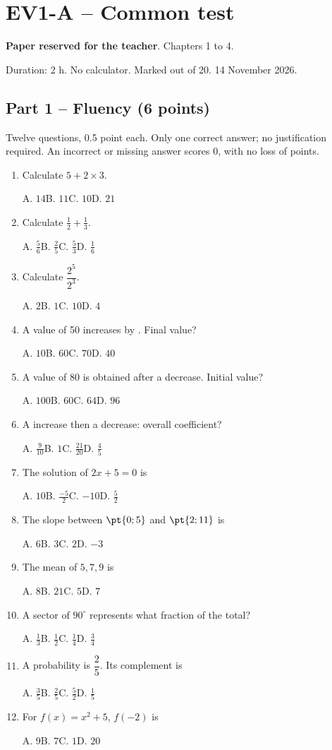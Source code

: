 \mxnewpage\section*{EV1-A -- Common test}\label{EV1-A}
\textbf{Paper reserved for the teacher}. Chapters 1 to 4.\par Duration: 2 h. No calculator. Marked out of 20. 14 November 2026.
\subsection*{Part 1 -- Fluency (6 points)}
Twelve questions, \num{0,5} point each. Only one correct answer; no justification required. An incorrect or missing answer scores 0, with no loss of points.
\begin{enumerate}
\item Calculate $5+2\times3$.\par A. $14$\quad B. $11$\quad C. $10$\quad D. $21$
\item Calculate $\frac12+\frac13$.\par A. $\frac{5}{6}$\quad B. $\frac{2}{5}$\quad C. $\frac{5}{3}$\quad D. $\frac{1}{6}$
\item Calculate $\dfrac{2^5}{2^{3}}$.\par A. $2$\quad B. $1$\quad C. $10$\quad D. $4$
\item A value of 50 increases by . Final value?\par A. $10$\quad B. $60$\quad C. $70$\quad D. $40$
\item A value of 80 is obtained after a  decrease. Initial value?\par A. $100$\quad B. $60$\quad C. $64$\quad D. $96$
\item A  increase then a  decrease: overall coefficient?\par A. $\frac{9}{10}$\quad B. $1$\quad C. $\frac{21}{20}$\quad D. $\frac{4}{5}$
\item The solution of $2x+5=0$ is\par A. $10$\quad B. $\frac{-5}{2}$\quad C. $-10$\quad D. $\frac{5}{2}$
\item The slope between $\pt{0;5}$ and $\pt{2;11}$ is\par A. $6$\quad B. $3$\quad C. $2$\quad D. $-3$
\item The mean of $5, 7, 9$ is\par A. $8$\quad B. $21$\quad C. $5$\quad D. $7$
\item A sector of $90^\circ$ represents what fraction of the total?\par A. $\frac{1}{3}$\quad B. $\frac{1}{2}$\quad C. $\frac{1}{4}$\quad D. $\frac{3}{4}$
\item A probability is $\dfrac{2}{5}$. Its complement is\par A. $\frac{3}{5}$\quad B. $\frac{2}{5}$\quad C. $\frac{5}{2}$\quad D. $\frac{1}{5}$
\item For $f(x)=x^2+5$, $f(-2)$ is\par A. $9$\quad B. $7$\quad C. $1$\quad D. $20$
\end{enumerate}
